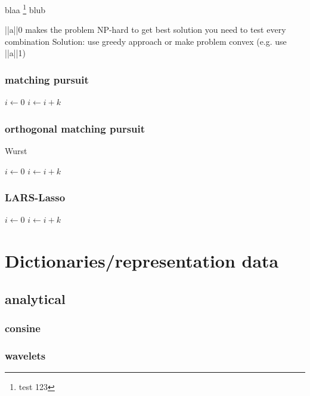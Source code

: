 blaa \footnote{test 123} blub

||a||0 makes the problem NP-hard
to get best solution you need to test every combination
Solution:
use greedy approach or 									make problem convex (e.g. use ||a||1)
\subsubsection{matching pursuit}
\begin{algorithmic}
        \STATE $i\gets 0$
\ELSE
                \STATE $i\gets i+k$
        \ENDIF
\ENDIF 
\end{algorithmic}

\subsubsection{orthogonal matching pursuit}
\label{sec:omp}
\begin{algorithm}
\caption{Wurst}
\begin{algorithmic}
        \STATE $i\gets 0$
\ELSE
                \STATE $i\gets i+k$
        \ENDIF
\ENDIF 
\end{algorithmic}

\subsubsection{LARS-Lasso}
\begin{algorithmic}
        \STATE $i\gets 0$
\ELSE
                \STATE $i\gets i+k$
        \ENDIF
\ENDIF 
\end{algorithmic}
\end{algorithm}

\section{Dictionaries/representation data}
\subsection{analytical}
\subsubsection{consine}
\subsubsection{wavelets}

